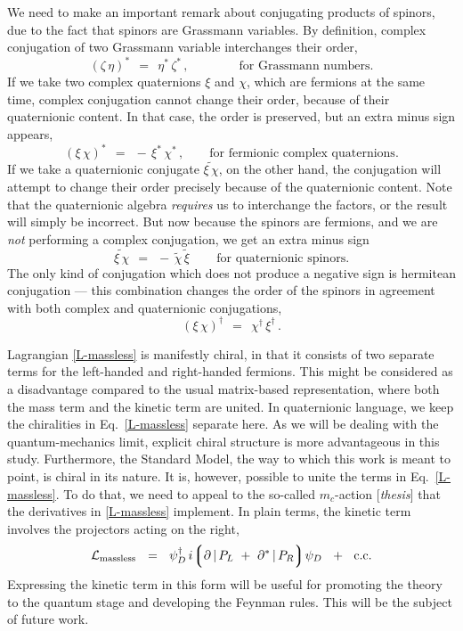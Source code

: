 \documentclass[epsfig,12pt]{article}
\newcommand{\p}{\partial}
\newcommand{\wt}{\widetilde}
\newcommand{\mc}[1]{\mathcal{#1}}
\newcommand{\lgr}{\left\lgroup}
\newcommand{\rgr}{\right\rgroup}
\begin{document}
	We need to make an important remark about conjugating products of spinors,
	due to the fact that spinors are Grassmann variables.
	By definition, complex conjugation of two Grassmann variable interchanges their order,
\begin{equation}
	(\zeta\, \eta)^*	~~=~~	\eta^*\, \zeta^*\,,\qquad\qquad \text{for Grassmann numbers.}
\end{equation}
	If we take two complex quaternions $ \xi $ and $ \chi $, which are fermions at the same time,
	complex conjugation cannot change their order, because of their quaternionic content.
	In that case, the order is preserved, but an extra minus sign appears,
\begin{equation}
\label{ferm-cc}
	(\xi\, \chi)^*		~~=~~	-\, \xi^*\, \chi^*\,,\qquad \text{for fermionic complex quaternions.}
\end{equation}
	If we take a quaternionic conjugate $ \wt{\xi\, \chi} $, on the other hand, 
	the conjugation will attempt to change their order precisely because of the quaternionic content.
	Note that the quaternionic algebra \emph{requires} us to interchange the factors, or
	the result will simply be incorrect.
	But now because the spinors are fermions, and we are \emph{not} performing a
	complex conjugation, we get an extra minus sign
\begin{equation}
\label{ferm-qc}
	\wt{\xi\, \chi}		~~=~~	-\, \wt\chi\, \wt\xi\,\qquad \text{for quaternionic spinors.}
\end{equation}
	The only kind of conjugation which does not produce a negative sign is hermitean
	conjugation --- this combination changes the order of the spinors in agreement with
	both complex and quaternionic conjugations,
\begin{equation}
\label{ferm-hc}
	(\xi\, \chi)^\dag	~~=~~	\chi^\dag\, \xi^\dag\,.
\end{equation}

	Lagrangian \eqref{L-massless} is manifestly chiral, in that it consists of two separate
	terms for the left-handed and right-handed fermions.
	This might be considered as a disadvantage compared to the usual matrix-based representation,
	where both the mass term and the kinetic term are united.
	In quaternionic language, we keep the chiralities in Eq.~\eqref{L-massless} separate here.
	As we will be dealing with the quantum-mechanics limit, explicit chiral structure is more advantageous
	in this study.
	Furthermore, the Standard Model, the way to which this work is meant to point, is chiral in its nature.
	It is, however, possible to unite the terms in Eq.~\eqref{L-massless}.
	To do that, we need to appeal to the so-called $ m_c $-action [\emph{thesis}] that the derivatives
	in \eqref{L-massless} implement.
	In plain terms, the kinetic term involves the projectors acting on the right,
\begin{equation}
\label{L-united}
	\mc L_\text{massless}	~~=~~	\psi_D^\dag\, i\!\lgr \p \,|\, P_L ~+~ \p^* \,|\, P_R \rgr\! \psi_D  ~~+~~  \text{c.c.}
\end{equation}
	Expressing the kinetic term in this form will be useful for promoting the theory
	to the quantum stage and developing the Feynman rules.
	This will be the subject of future work.
\end{document}
